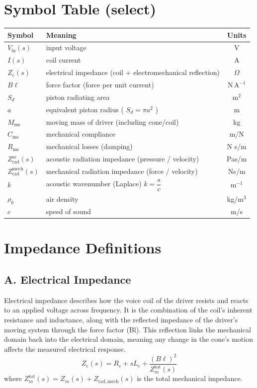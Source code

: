\section{Symbol Table (select)}
\begin{center}
\begin{tabular}{llc}
\toprule
Symbol & Meaning & Units \\
\midrule
$V_{\mathrm{in}}(s)$ & input voltage & V \\
$I(s)$ & coil current & A \\
$Z_e(s)$ & electrical impedance (coil + electromechanical reflection) & $\Omega$ \\
$B\ell$ & force factor (force per unit current) & $\mathrm{N\,A^{-1}}$ \\
$S_d$ & piston radiating area & $\mathrm{m^2}$ \\
$a$ & equivalent piston radius ( $S_d=\pi a^2$ ) & m \\
$M_{\mathrm{ms}}$ & moving mass of driver (including cone/coil) & kg \\
$C_{\mathrm{ms}}$ & mechanical compliance & m/N \\
$R_{\mathrm{ms}}$ & mechanical losses (damping) & N s/m \\
$Z_{\mathrm{rad}}^{\mathrm{ac}}(s)$ & acoustic radiation impedance (pressure / velocity) & Pa\;s/m \\
$Z_{\mathrm{rad}}^{\mathrm{mech}}(s)$ & mechanical radiation impedance (force / velocity) & N\;s/m \\
$k$ & acoustic wavenumber (Laplace) $k=\dfrac{s}{c}$ & $\mathrm{m^{-1}}$ \\
$\rho_0$ & air density & kg/m$^3$ \\
$c$ & speed of sound & m/s \\
\bottomrule
\end{tabular}
\end{center}


\newpage
\section{Impedance Definitions}

\subsection*{A. Electrical Impedance}
Electrical impedance describes how the voice coil of the driver resists and reacts to an applied voltage across frequency. It is the combination of the coil’s inherent resistance and inductance, along with the reflected impedance of the driver’s moving system through the force factor (Bl). This reflection links the mechanical domain back into the electrical domain, meaning any change in the cone’s motion affects the measured electrical response. 
\[
Z_e(s) = R_e + sL_e + \frac{(B\ell)^2}{Z_m^{\text{tot}}(s)}
\]
where $Z_m^{\text{tot}}(s) = Z_m(s) + Z_{\mathrm{rad, mech}}(s)$ is the total mechanical impedance.

